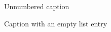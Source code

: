 \documentclass{article}
\begin{document}
\listoffigures
\begin{figure}[h]
  \caption*{Unnumbered caption}%
\end{figure}
\begin{figure}[h]
  \caption[]{Caption with an empty list entry}%
\end{figure}
\end{document}
